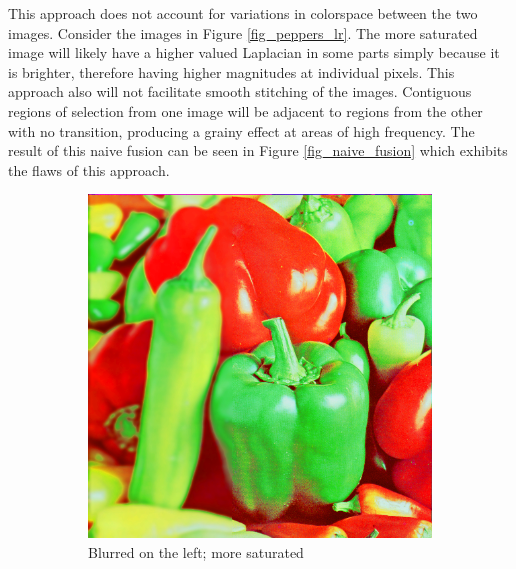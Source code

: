\documentclass{article}
\begin{document}
This approach does not account for variations in colorspace between the two images. Consider the images in Figure \ref{fig_peppers_lr}. The more saturated image will likely have a higher valued Laplacian in some parts simply because it is brighter, therefore having higher magnitudes at individual pixels. This approach also will not facilitate smooth stitching of the images. Contiguous regions of selection from one image will be adjacent to regions from the other with no transition, producing a grainy effect at areas of high frequency. The result of this naive fusion can be seen in Figure \ref{fig_naive_fusion} which exhibits the flaws of this approach.

\begin{figure}
	\centering
	\begin{subfigure}[b]{0.45\textwidth}
		\centering
		\includegraphics[width=\textwidth]{figures/peppers/peppers_blur_left}
		\caption{Blurred on the left; more saturated}
	\end{subfigure}
	\begin{subfigure}[b]{0.45\textwidth}
		\centering

\end{subfigure}
\end{figure}
\end{document}
